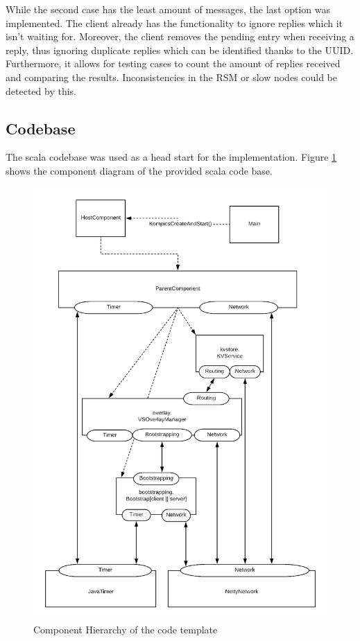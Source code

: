 \documentclass[a4paper]{scrartcl}
\begin{document}
While the second case has the least amount of messages, the last option was implemented. 
The client already has the functionality to ignore replies which it isn't waiting for.
Moreover, the client removes  the pending entry when receiving a reply, thus ignoring duplicate replies which can be identified thanks to the UUID.
Furthermore, it allows for testing cases to count the amount of replies received and comparing the results.
Inconsistencies in the RSM or slow nodes could be detected by this.



\subsection{Codebase}
The scala codebase was used as a head start for the implementation.
Figure \ref{fig:initial} shows the component diagram of the provided scala code base. 

\begin{figure}[h!]
  \begin{center}
    \includegraphics[scale=0.4]{Initial.png}
    \caption{Component Hierarchy of the code template}
    \label{fig:initial}
  \end{center}
\end{figure}
\end{document}
